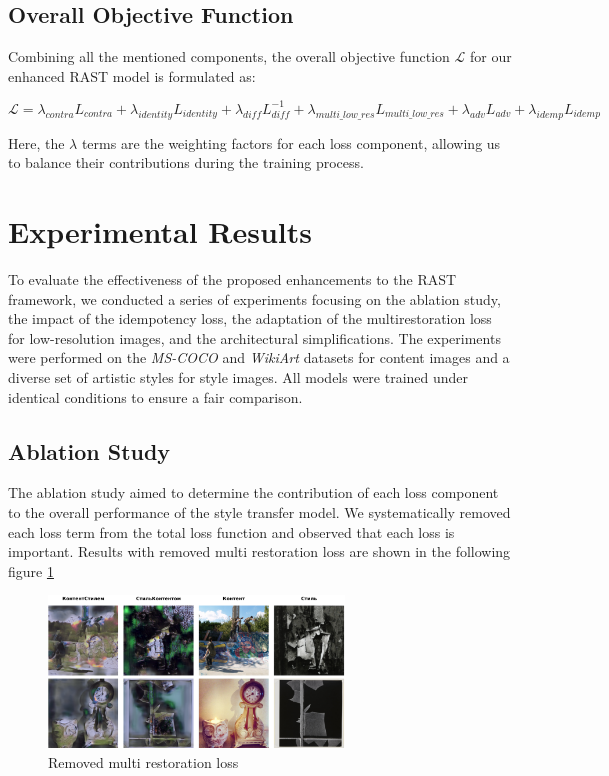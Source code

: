 \documentclass{article}
\begin{document}
\subsection{Overall Objective Function}
Combining all the mentioned components, the overall objective function \( \mathcal{L} \) for our enhanced RAST model is formulated as:

\[
\mathcal{L} = \lambda_{contra} L_{contra} + \lambda_{identity} L_{identity} + \lambda_{diff} L^{-1}_{diff} + \lambda_{multi\_low\_res} L_{multi\_low\_res} + \lambda_{adv} L_{adv} + \lambda_{idemp} L_{idemp}
\]

Here, the \( \lambda \) terms are the weighting factors for each loss component, allowing us to balance their contributions during the training process.

\section{Experimental Results}
\label{sec:experimental_results}

To evaluate the effectiveness of the proposed enhancements to the RAST framework, we conducted a series of experiments focusing on the ablation study, the impact of the idempotency loss, the adaptation of the multirestoration loss for low-resolution images, and the architectural simplifications. The experiments were performed on the \textit{MS-COCO} and \textit{WikiArt} datasets for content images and a diverse set of artistic styles for style images. All models were trained under identical conditions to ensure a fair comparison.

\subsection{Ablation Study}
The ablation study aimed to determine the contribution of each loss component to the overall performance of the style transfer model. We systematically removed each loss term from the total loss function and observed that each loss is important. Results with removed multi restoration loss are shown in the following figure \ref{fig:ablation}

\begin{figure}[H]
    \centering
    \includegraphics[width=0.7\textwidth]{figures/ablation_results.png}
    \caption{Removed multi restoration loss}
    \label{fig:ablation}
\end{figure}
\end{document}
